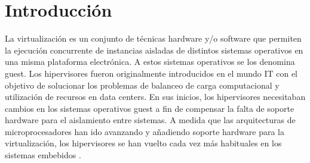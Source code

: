 \chapter{Introducción}
\label{ch:introduccion:primera}
La virtualización es un conjunto de técnicas hardware y/o software que permiten la ejecución
concurrente de instancias aisladas de distintos sistemas operativos en una misma plataforma
electrónica. A estos sistemas operativos se los denomina guest.
Los hipervisores fueron originalmente introducidos en el mundo IT con el objetivo de solucionar los problemas de
balanceo de carga computacional y utilización de recursos en data centers. En sus inicios, los hipervisores necesitaban cambios en los sistemas operativos guest a fin de compensar la falta de soporte hardware para el aislamiento
entre sistemas. A medida que las arquitecturas de microprocesadores han ido avanzando y añadiendo
soporte hardware para la virtualización, los hipervisores se han vuelto cada vez más habituales en los
sistemas embebidos \cite{EmbeddedWorld2018}.

